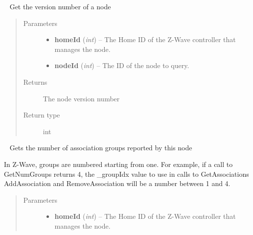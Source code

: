 \documentclass[letterpaper,10pt,english]{sphinxmanual}
\begin{document}
\begin{fulllineitems}
\begin{fulllineitems}
\begin{quote}
\begin{description}
\end{description}\end{quote}

\end{fulllineitems}


\begin{fulllineitems}
\label{libopenzwave:libopenzwave.PyManager.getNodeVersion}~\label{libopenzwave:getnodeversion}
Get the version number of a node
\begin{quote}\begin{description}
\item[{Parameters}] \leavevmode\begin{itemize}
\item {} 
\textbf{homeId} (\emph{int}) -- The Home ID of the Z-Wave controller that manages the node.

\item {} 
\textbf{nodeId} (\emph{int}) -- The ID of the node to query.

\end{itemize}

\item[{Returns}] \leavevmode
The node version number

\item[{Return type}] \leavevmode
int

\end{description}\end{quote}

\end{fulllineitems}


\begin{fulllineitems}
\label{libopenzwave:libopenzwave.PyManager.getNumGroups}~\label{libopenzwave:getnumgroups}
Gets the number of association groups reported by this node

In Z-Wave, groups are numbered starting from one.  For example, if a call to
GetNumGroups returns 4, the \_groupIdx value to use in calls to GetAssociations
AddAssociation and RemoveAssociation will be a number between 1 and 4.
\begin{quote}\begin{description}
\item[{Parameters}] \leavevmode\begin{itemize}
\item {} 
\textbf{homeId} (\emph{int}) -- The Home ID of the Z-Wave controller that manages the node.


\end{itemize}
\end{description}
\end{quote}
\end{fulllineitems}
\end{fulllineitems}
\end{document}
